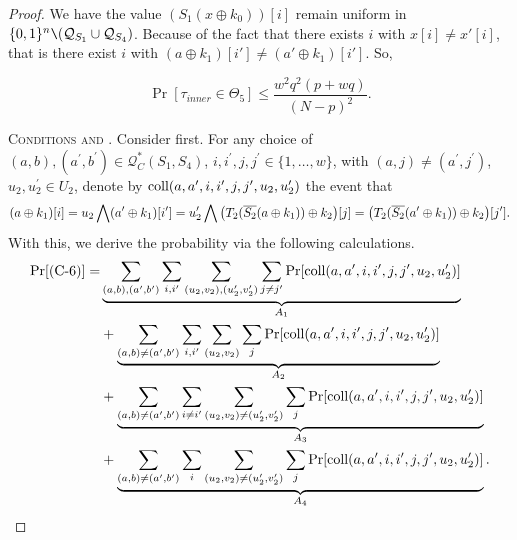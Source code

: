 \begin{proof}
%
%
%
%
%













We have the value $\left(S_{1}\left(x \oplus k_{0}\right)\right)[i]$ remain uniform in $\{0, 1\}^{n} \verb|\| (\mathcal{Q}_{S_{1}} \cup \mathcal{Q}_{S_{4}})$.  Because of the fact that there exists $i$ with $x[i]\neq x'[i]$, that is there exist $i$ with $\left(a \oplus k_{1}\right)[i'] \neq \left(a' \oplus k_{1}\right)[i']$. So,

$$
\operatorname{Pr}\left[\tau_{inner} \in \Theta_{5}\right] \leq \frac{w^{2} q^{2} (p+w q)}{(N-p)^2}.
$$





\smallskip
\noindent\textsc{Conditions \csix and \cnine}. Consider \csix first. For any choice of $(a, b), (a^{\prime}, b^{\prime}) \in \mathcal{Q}_{C}^{*}\left(S_{1}, S_{4}\right)$, $i, i^{\prime},j, j^{\prime} \in\{1, \ldots, w\}$, with $(a, j) \neq \left(a^{\prime}, j^{\prime}\right)$, $u_{2}, u_{2}^{\prime} \in U_{2}$, denote by $\text{coll}(a,a',i,i',j,j',u_2,u_2')$ the event that
%
%
$$(a \oplus k_1)[i] = u_2\bigwedge(a' \oplus k_1)[i'] = u_2'\bigwedge\big(T_2(\overline{S_2}(a\oplus k_1))\oplus k_2\big)[j]=\big(T_2(\overline{S_2}(a'\oplus k_1))\oplus k_2\big)[j'].
$$
%
%
With this, we derive the probability via the following calculations.
%
%
\begin{align*}
 \Pr[\text{(C-6)}]  
=   &  \underbrace{\sum_{(a,b),(a',b')}\sum_{i,i'}\sum_{(u_2,v_2),(u_2',v_2')}\sum_{j\neq j'}\Pr[\text{coll}(a,a',i,i',j,j',u_2,u_2')]}_{A_1}    \\
&  + \underbrace{\sum_{(a,b)\neq(a',b')}\sum_{i,i'}\sum_{(u_2,v_2)}\sum_{j}\Pr[\text{coll}(a,a',i,i',j,j',u_2,u_2')]}_{A_2}      \\
  &  +  \underbrace{\sum_{(a,b)\neq(a',b')}\sum_{i\neq i'}\sum_{(u_2,v_2)\neq(u_2',v_2')}\sum_{j}\Pr[\text{coll}(a,a',i,i',j,j',u_2,u_2')]}_{A_3}       \\
    &  + \underbrace{\sum_{(a,b)\neq(a',b')}\sum_{i}\sum_{(u_2,v_2)\neq(u_2',v_2')}\sum_{j}\Pr[\text{coll}(a,a',i,i',j,j',u_2,u_2')]}_{A_4}   .
\end{align*}




\end{proof}
